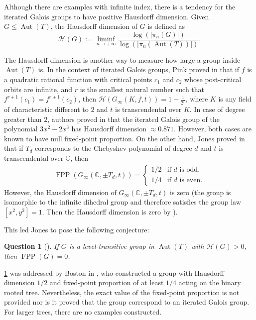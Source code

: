 \documentclass{amsart}
\def\abs#1{\left\vert{#1}\right\vert}
\def\CC{\mathbb C}
\DeclareMathOperator{\Aut}{Aut}
\DeclareMathOperator{\FPP}{FPP}
\newtheorem{Question}[Proposition]{Question}
\begin{document}
Although there are examples with infinite index, there is a tendency for the iterated Galois groups to have positive Hausdorff dimension. Given $G \leq \Aut(T)$, the Hausdorff dimension of $G$ is defined as $$\mathcal{H}(G) := \liminf_{n \rightarrow +\infty} \frac{\log(\abs{\pi_n(G)})}{\log(\abs{\pi_n(\Aut(T))})}.$$

The Hausdorff dimension is another way to measure how large a group inside $\Aut(T)$ is. In the context of iterated Galois groups, Pink proved in \cite[Theorem 4.4.2]{Pink2013} that if $f$ is a quadratic rational function with critical points $c_1$ and $c_2$ whose post-critical orbits are infinite, and $r$ is the smallest natural number such that $f^{r+1}(c_1) = f^{r+1}(c_2)$, then $\mathcal{H}(G_\infty(K,f,t)) = 1- \frac{1}{2^r}$, where $K$ is any field of characteristic different to $2$ and $t$ is transcendental over $K$. In case of degree greater than $2$, authors proved in \cite[Theorem 1.1]{Benedetto2017} that the iterated Galois group of the polynomial $3x^2-2x^3$ has Hausdorff dimension $\approx 0.871$. However, both cases are known to have null fixed-point proportion. On the other hand, Jones proved in \cite{Jones2012} that if $T_d$ corresponds to the Chebyshev polynomial of degree $d$ and $t$ is transcendental over $\CC$, then 
\begin{align*}
\FPP(G_\infty(\CC,\pm T_d,t)) = \left \{ \begin{matrix} 
1/2 & \mbox{if $d$ is odd,} \\ 
1/4 & \mbox{if $d$ is even.}
\end{matrix}\right.
\end{align*} 
However, the Hausdorff dimension of $G_\infty(\CC,\pm T_d, t)$ is zero (the group is isomorphic to the infinite dihedral group and therefore satisfies the group law $[x^2,y^2] = 1$. Then the Hausdorff dimension is zero by \cite[Corollary 5]{Fariña2025}). 

This led Jones to pose the following conjecture:

\begin{Question}[{\cite[Conjecture 17]{Jones2008survey}}]
If $G$ is a level-transitive group in $\Aut(T)$ with $\mathcal{H}(G) > 0$, then $\FPP(G) = 0$.
\label{Conjecture: Jones hdim > 0 fpp = 0}
\end{Question}

\cref{Conjecture: Jones hdim > 0 fpp = 0} was addressed by Boston in \cite{Boston2010}, who constructed a group with Hausdorff dimension $1/2$ and fixed-point proportion of at least $1/4$ acting on the binary rooted tree. Nevertheless, the exact value of the fixed-point proportion is not provided nor is it proved that the group correspond to an iterated Galois group. For larger trees, there are no examples constructed.
\end{document}
